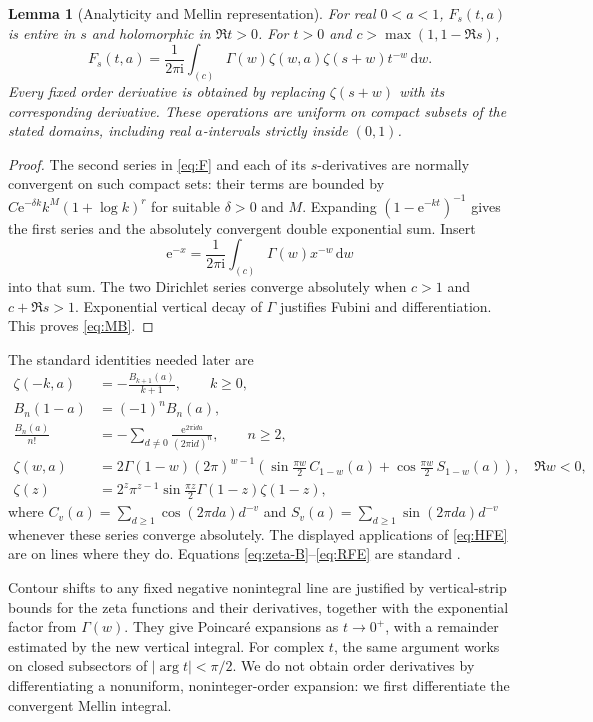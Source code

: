 \documentclass[11pt,a4paper]{article}
\numberwithin{equation}{section}
\newtheorem{lemma}[theorem]{Lemma}
\theoremstyle{definition}\newtheorem{definition}[theorem]{Definition}
\theoremstyle{remark}\newtheorem{remark}[theorem]{Remark}
\newcommand{\ii}{\mathrm i}\newcommand{\e}{\mathrm e}
\newcommand{\dd}{\,\mathrm d}\newcommand{\Li}{\operatorname{Li}}
\begin{document}
\begin{lemma}[Analyticity and Mellin representation]\label{lem:Mellin}
For real $0<a<1$, $F_s(t,a)$ is entire in $s$ and holomorphic in
$\Re t>0$. For $t>0$ and $c>\max(1,1-\Re s)$,
\begin{equation}
 F_s(t,a)=\frac1{2\pi\ii}\int_{(c)}
  \Gamma(w)\zeta(w,a)\zeta(s+w)t^{-w}\dd w.
 \label{eq:MB}
\end{equation}
Every fixed order derivative is obtained by replacing $\zeta(s+w)$
with its corresponding derivative. These operations are uniform on
compact subsets of the stated domains, including real $a$-intervals
strictly inside $(0,1)$.
\end{lemma}
\begin{proof}
The second series in \eqref{eq:F} and each of its $s$-derivatives are
normally convergent on such compact sets: their terms are bounded by
$C\e^{-\delta k}k^M(1+\log k)^r$ for suitable $\delta>0$ and $M$.
Expanding $(1-\e^{-kt})^{-1}$ gives the first series and the absolutely
convergent double exponential sum. Insert
\[
 \e^{-x}=\frac1{2\pi\ii}\int_{(c)}\Gamma(w)x^{-w}\dd w
\]
into that sum. The two Dirichlet series converge absolutely when
$c>1$ and $c+\Re s>1$. Exponential vertical decay of $\Gamma$ justifies
Fubini and differentiation. This proves \eqref{eq:MB}.
\end{proof}

The standard identities needed later are
\begin{align}
 \zeta(-k,a)&=-\frac{B_{k+1}(a)}{k+1},\qquad k\ge0,
       \label{eq:zeta-B}\\
 B_n(1-a)&=(-1)^nB_n(a),\label{eq:B-reflection}\\
 \frac{B_n(a)}{n!}&=-\sum_{d\ne0}\frac{\e^{2\pi\ii da}}{(2\pi\ii d)^n},
       \qquad n\ge2,\label{eq:B-Fourier}\\
 \zeta(w,a)&=2\Gamma(1-w)(2\pi)^{w-1}
  \left(\sin\frac{\pi w}{2}\,C_{1-w}(a)
             +\cos\frac{\pi w}{2}\,S_{1-w}(a)\right),
       \quad\Re w<0,\label{eq:HFE}\\
 \zeta(z)&=2^z\pi^{z-1}\sin\frac{\pi z}{2}
                     \Gamma(1-z)\zeta(1-z),\label{eq:RFE}
\end{align}
where $C_v(a)=\sum_{d\ge1}\cos(2\pi da)d^{-v}$ and
$S_v(a)=\sum_{d\ge1}\sin(2\pi da)d^{-v}$ whenever these series converge
absolutely. The displayed applications of \eqref{eq:HFE} are on lines
where they do. Equations \eqref{eq:zeta-B}--\eqref{eq:RFE} are standard
\cite[Sections~24.8, 25.4, 25.11]{dlmf}.

Contour shifts to any fixed negative nonintegral line are justified by
vertical-strip bounds for the zeta functions and their derivatives,
together with the exponential factor from $\Gamma(w)$. They give
Poincar\'e expansions as $t\to0^+$, with a remainder estimated by the
new vertical integral. For complex $t$, the same argument works on
closed subsectors of $|\arg t|<\pi/2$. We do not obtain order derivatives
by differentiating a nonuniform, noninteger-order expansion: we first
differentiate the convergent Mellin integral.
\end{document}
